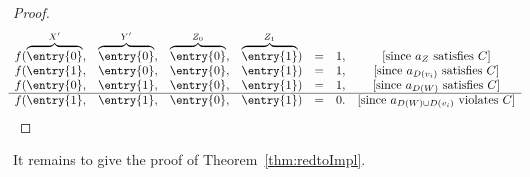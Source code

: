 \begin{proof}
\begin{align*}
\begin{matrix}
f( \overbrace{\entry{0}}^{X'},& \overbrace{\entry{0}}^{Y'}, & \overbrace{\entry{0}}^{Z_0}, & \overbrace{\entry{1}}^{Z_1}) & = & 1, & \text{[since $a_Z$ satisfies $C$]} \\
f( \entry{1},& \entry{0}, & \entry{0}, & \entry{1}) & = & 1, & \text{[since $a_{D(v_i)}$ satisfies $C$]} \\
f( \entry{0},& \entry{1}, & \entry{0}, & \entry{1}) & = & 1, & \text{[since $a_{D(W)}$ satisfies $C$]} \\
  \hline
f( \entry{1},& \entry{1}, & \entry{0}, & \entry{1}) & = & 0. & \text{[since $a_{D(W)\cup D(v_i)}$ violates $C$]} \\
\end{matrix}
\end{align*}
%
%
%
\end{proof}
%
It remains to give the proof of Theorem~\ref{thm:redtoImpl}.
